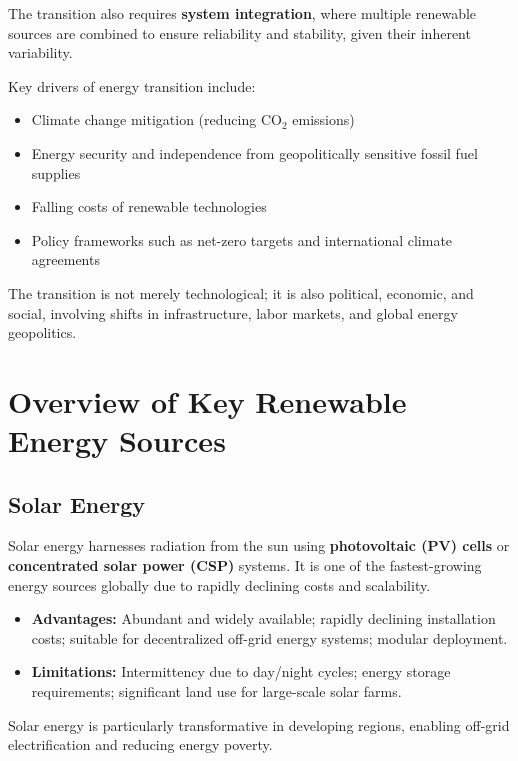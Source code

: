 \documentclass[12pt,a4paper]{article}
\begin{document}
The transition also requires \textbf{system integration}, where multiple renewable sources are combined to ensure reliability and stability, given their inherent variability.

Key drivers of energy transition include:
\begin{itemize}
    \item Climate change mitigation (reducing $\text{CO}_2$ emissions)
    \item Energy security and independence from geopolitically sensitive fossil fuel supplies
    \item Falling costs of renewable technologies
    \item Policy frameworks such as net-zero targets and international climate agreements
\end{itemize}

The transition is not merely technological; it is also political, economic, and social, involving shifts in infrastructure, labor markets, and global energy geopolitics.

\section{Overview of Key Renewable Energy Sources}

\subsection{Solar Energy}

Solar energy harnesses radiation from the sun using \textbf{photovoltaic (PV) cells} or \textbf{concentrated solar power (CSP)} systems. It is one of the fastest-growing energy sources globally due to rapidly declining costs and scalability.

\begin{itemize}
    \item \textbf{Advantages:} Abundant and widely available; rapidly declining installation costs; suitable for decentralized off-grid energy systems; modular deployment.
    \item \textbf{Limitations:} Intermittency due to day/night cycles; energy storage requirements; significant land use for large-scale solar farms.
\end{itemize}

Solar energy is particularly transformative in developing regions, enabling off-grid electrification and reducing energy poverty.
\end{document}
